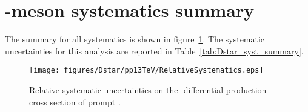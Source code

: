 \section{\Dstar -meson systematics summary}

The summary for all systematics is shown in figure~\ref{fig:DstarSystSum}. The systematic uncertainties for this analysis are reported in Table~\ref{tab:Dstar_syst_summary}.


\begin{figure}[tb]
\begin{center}
 \texttt{[image: figures/Dstar/pp13TeV/RelativeSystematics.eps]}
\caption{Relative systematic uncertainties on the \pt -differential production cross section of prompt \Dstar.}
\label{fig:DstarSystSum}
\end{center}
\end{figure}


